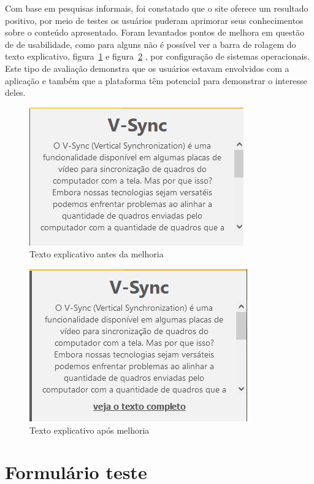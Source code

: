 \documentclass[tcc,capa]{texufpel}
\begin{document}
Com base em pesquisas informais, foi constatado que o site oferece um resultado positivo, por meio de testes os usuários puderam aprimorar seus conhecimentos sobre o conteúdo apresentado. Foram levantados pontos de melhora em questão de de usabilidade, como para alguns não é possível ver a barra de rolagem do texto explicativo, figura~\ref{antes_texto_explicativo} e figura~\ref{melhoria_texto_explicativo} , por configuração de sistemas operacionais. Este tipo de avaliação demonstra que os usuários estavam envolvidos com a aplicação e também que a plataforma têm potencial para demonstrar o interesse deles.

\begin{figure}[htbp]
  \centering \includegraphics[scale=.3]{Navegacao/antes_texto_explicativo.jpeg}
  \caption{Texto explicativo antes da melhoria}
  \label{antes_texto_explicativo}
\end{figure}

\begin{figure}[htbp]
  \centering \includegraphics[scale=.3]{Navegacao/melhoria_texto_explicativo.jpeg}
  \caption{Texto explicativo após melhoria}
  \label{melhoria_texto_explicativo}
\end{figure}

\section{Formulário teste}
\end{document}
